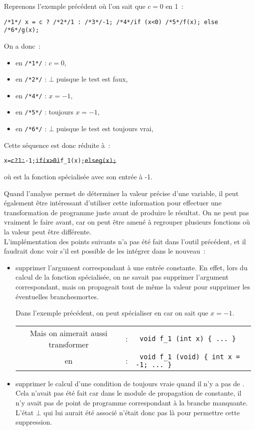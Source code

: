 \begin{exemple}
  Reprenons l'exemple précédent où l'on sait que $c=0$ en 1~:
\begin{center}
  \verb!/*1*/ x = c ? /*2*/1 : /*3*/-1; /*4*/if (x<0) /*5*/f(x); else /*6*/g(x); !
\end{center}
On a donc~:
\begin{itemize}
  \item en \verb!/*1*/! : $c=0$,
  \item en \verb!/*2*/! : $\bot$ puisque le test est faux,
  \item en \verb!/*4*/! : $x=-1$,
  \item en \verb!/*5*/! : toujours $x=-1$,
  \item en \verb!/*6*/! : $\bot$ puisque le test est toujours vrai,
\end{itemize}
Cette séquence est donc réduite à~:
\begin{alltt}
  x = \sout{ c ? 1 : } -1; \sout{ if (x>0)} f\_1(x); \sout{ else  g(x); }
\end{alltt}
où  est la fonction  spécialisée avec son entrée à -1.\\
\end{exemple}

Quand l'analyse permet de déterminer la valeur précise d'une variable,
il peut également être intéressant d'utiliser cette information pour effectuer
une transformation de programme juste avant de produire le résultat.
On ne peut pas vraiment le faire avant, car on peut être amené à regrouper
plusieurs fonctions où la valeur peut être différente.\\


L'implémentation des points suivants n'a pas été fait dans l'outil précédent,
et il faudrait donc voir s'il est possible de les intégrer
dans le nouveau~:
  \begin{itemize}
    \item supprimer l'argument correspondant à une entrée constante.
En effet, lors du calcul de la fonction spécialisée, on ne savait
pas supprimer l'argument correspondant,
mais on propageait tout de même la valeur pour supprimer les éventuelles
branchesmortes. 
\begin{exemple}
Dans l'exemple précédent,
on peut spécialiser  en  car on sait que $x=-1$.
\begin{tabular}{ccl}
Mais on aimerait aussi transformer &:& \verb! void f_1 (int x) { ... }!\\
en &:& \verb! void f_1 (void) { int x = -1; ... }!
\end{tabular}
\end{exemple}
\item supprimer le calcul d'une condition de  toujours vraie quand il
  n'y a pas de . Cela n'avait pas été fait car dans
le module de propagation de constante,
il n'y avait pas de point de programme correspondant à la branche
 manquante. L'état $\bot$ qui lui aurait été
 associé n'était donc pas là pour permettre cette suppression.

  \end{itemize}

